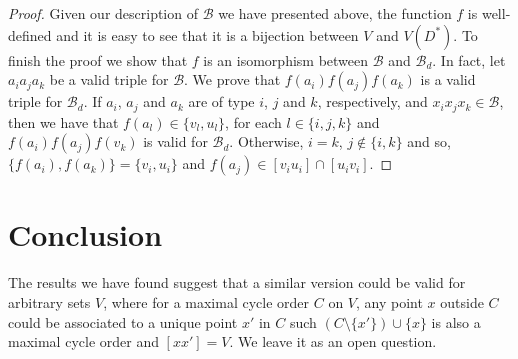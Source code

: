 \documentclass{article}
\newcommand{\calb}{\mathcal{B}}
\begin{document}
\begin{proof}
    Given our description of $\calb$ we have presented  above, the function $f$ is well-defined and it is easy to see that it is a bijection between $V$ and $V(D^*)$. To finish the proof we show that $f$ is an isomorphism between $\calb$ and $\calb_d$.  In fact, let  $a_ia_ja_k$ be a valid triple for $\calb$. We prove that $f(a_i)f(a_j)f(a_k)$ is a valid triple for $\calb_d$. If $a_i$, $a_j$ and $a_k$ are of type $i$, $j$ and $k$, respectively, and $x_ix_jx_k\in \calb$, then we have that $f(a_l) \in \{v_l,u_l\}$, for each $l\in \{i,j,k\}$ and $f(a_i)f(a_j)f(v_k)$ is valid for $\calb_d$. Otherwise, $i=k$, $j \notin \{i,k\}$ and so, $\{f(a_i),f(a_k)\}=\{v_i,u_i\}$ and $f(a_j)\in [v_iu_i]\cap [u_iv_i]$. 
    
\end{proof}

\section{Conclusion}
The results we have found suggest that a similar version could be valid for arbitrary sets $V$, where for a maximal cycle order $C$ on $V$, any point $x$ outside $C$ could be associated to a unique point $x'$ in $C$ such $(C\setminus \{x'\})\cup \{x\}$ is also a maximal cycle order and $[xx']=V$. We leave it as an open question.



\end{document}
